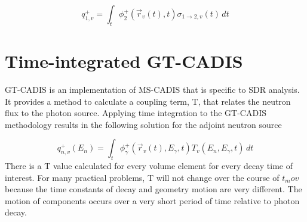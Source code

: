 \begin{equation}\label{eq:adj_src_1_avg}
	 q_{1,v}^{+} =
	 \int_{t}  \phi_{2}^{+}(\overrightarrow{r}_{v}(t), t)
	 \sigma_{1\rightarrow 2,v}(t)\, dt
 \end{equation}
 
\section{Time-integrated GT-CADIS}

GT-CADIS is an implementation of MS-CADIS that is specific to SDR analysis.  It
provides a method to calculate a coupling term, T, that relates the neutron
flux to the photon source.
Applying time integration to the GT-CADIS methodology results in the following
solution for the adjoint neutron source

 \begin{equation}\label{eq:adj_src_1_avg}
	 q_{n,v}^{+}(E_{n}) =
	 \int_{t}     \phi_{\gamma}^{+}(\overrightarrow{r}_{v}(t), E_{\gamma},t)
	 T_{v}(E_n, E_{\gamma}, t)\, dt
 \end{equation}
 There is a T value calculated for every volume element for every decay time of
 interest.  For many practical problems, T will not change over the course of
 $t_mov$  because the time constants of decay and geometry
 motion are very different.  The motion of components occurs over a very short
 period of time relative to photon decay.  
